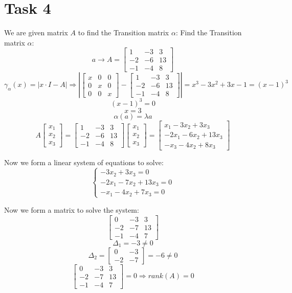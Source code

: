 \documentclass[11pt]{article}
\begin{document}
\section{Task 4}
\label{sec:orga08d43f}
We are given matrix \(A\) to find the Transition matrix \(\alpha\):
Find the Transition matrix $\alpha$:
\[
a \rightarrow
A =
\begin{bmatrix}
1 & -3 & 3 \\
-2 & -6 & 13 \\
-1 & -4 & 8
\end{bmatrix}
\]
\[
\gamma_\alpha (x) = \left| x \cdot I - A \right| \Rightarrow
\left|
\begin{bmatrix}
x & 0 & 0 \\
0 & x & 0 \\
0 & 0 & x
\end{bmatrix}
-
\begin{bmatrix}
1 & -3 & 3 \\
-2 & -6 & 13 \\
-1 & -4 & 8
\end{bmatrix}
\right|
= 
x^3 - 3x^2 + 3x - 1 = (x-1)^3
\]
\[
(x-1)^3 = 0
\]
\[
x = 3
\]
\[
\alpha(a) = \lambda a
\]
\[
A
\begin{bmatrix}
x_1 \\ x_2 \\ x_3
\end{bmatrix}
=
\begin{bmatrix}
1 & -3 & 3 \\
-2 & -6 & 13 \\
-1 & -4 & 8
\end{bmatrix}
\begin{bmatrix}
x_1 \\ x_2 \\ x_3
\end{bmatrix}
= 
\begin{bmatrix}
x_1 - 3x_2 + 3x_3 \\
-2x_1 - 6x_2 + 13x_3 \\
-x_3 - 4x_2 + 8x_3
\end{bmatrix}
\]

Now we form a linear system of equations to solve:
\[
\left\{
\begin{aligned}
-3x_2 + 3x_3 = 0 \\
-2x_1 - 7x_2 + 13x_3 = 0 \\
-x_1 - 4x_2 + 7x_3 = 0
\end{aligned}
\]

Now we form a matrix to solve the system:
\[
\begin{bmatrix}
0 & -3 & 3 \\
-2 & -7 & 13 \\
-1 & -4 & 7
\end{bmatrix}
\]
\[
\Delta_1 = -3 \neq 0
\]
\[
\Delta_2 = 
\begin{bmatrix}
0 & -3 \\
-2 & -7
\end{bmatrix}
= 
-6 \neq 0
\]
\[
\begin{bmatrix}
0 & -3 & 3 \\
-2 & -7 & 13 \\
-1 & -4 & 7
\end{bmatrix}
= 0
\Rightarrow
rank(A) = 0
\]
\end{document}
